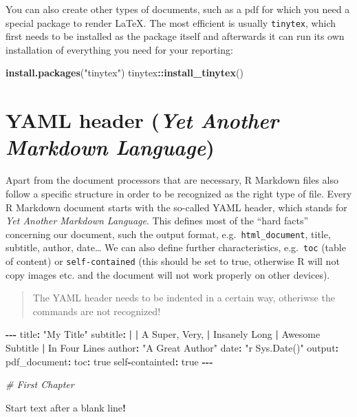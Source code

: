 \documentclass[
]{book}
\newenvironment{Shaded}{\begin{snugshade}}{\end{snugshade}}
\newcommand{\CommentTok}[1]{\textcolor[rgb]{0.56,0.35,0.01}{\textit{#1}}}
\newcommand{\ErrorTok}[1]{\textcolor[rgb]{0.64,0.00,0.00}{\textbf{#1}}}
\newcommand{\FunctionTok}[1]{\textcolor[rgb]{0.13,0.29,0.53}{\textbf{#1}}}
\newcommand{\NormalTok}[1]{#1}
\newcommand{\SpecialCharTok}[1]{\textcolor[rgb]{0.81,0.36,0.00}{\textbf{#1}}}
\newcommand{\StringTok}[1]{\textcolor[rgb]{0.31,0.60,0.02}{#1}}
\begin{document}
You can also create other types of documents, such as a pdf for which you need a special package to render \LaTeX.
The most efficient is usually \texttt{tinytex}, which first needs to be installed as the package itself and afterwards it can run its own installation of everything you need for your reporting:

\begin{Shaded}
\begin{Highlighting}[]
\FunctionTok{install.packages}\NormalTok{(}\StringTok{"tinytex"}\NormalTok{)}
\NormalTok{tinytex}\SpecialCharTok{::}\FunctionTok{install\_tinytex}\NormalTok{()}
\end{Highlighting}
\end{Shaded}

\section{\texorpdfstring{YAML header (\emph{Yet Another Markdown Language})}{YAML header (Yet Another Markdown Language)}}\label{yaml-header-yet-another-markdown-language}

Apart from the document processors that are necessary, R Markdown files also follow a specific structure in order to be recognized as the right type of file.
Every R Markdown document starts with the so-called YAML header, which stands for \emph{Yet Another Markdown Language}.
This defines most of the ``hard facts'' concerning our document, such the output format, e.g.~\texttt{html\_document}, title, subtitle, author, date\ldots{}
We can also define further characteristics, e.g.~\texttt{toc} (table of content) or \texttt{self-contained} (this should be set to true, otherwise R will not copy images etc. and the document will not work properly on other devices).

\begin{quote}
The YAML header needs to be indented in a certain way, otheriwse the commands are not recognized!
\end{quote}

\begin{Shaded}
\begin{Highlighting}[]
\SpecialCharTok{{-}{-}{-}}
\NormalTok{title}\SpecialCharTok{:} \StringTok{"My Title"}
\NormalTok{subtitle}\SpecialCharTok{:} \ErrorTok{|}
    \ErrorTok{|}\NormalTok{ A Super, Very,}
    \SpecialCharTok{|}\NormalTok{ Insanely Long}
    \SpecialCharTok{|}\NormalTok{ Awesome Subtitle}
    \SpecialCharTok{|}\NormalTok{ In Four Lines}
\NormalTok{author}\SpecialCharTok{:} \StringTok{"A Great Author"}
\NormalTok{date}\SpecialCharTok{:} \StringTok{"\textasciigrave{}r Sys.Date()\textasciigrave{}"}
\NormalTok{output}\SpecialCharTok{:} 
\NormalTok{  pdf\_document}\SpecialCharTok{:}
\NormalTok{    toc}\SpecialCharTok{:}\NormalTok{ true}
\NormalTok{    self}\SpecialCharTok{{-}}\NormalTok{containted}\SpecialCharTok{:}\NormalTok{ true}
\SpecialCharTok{{-}{-}{-}}

\CommentTok{\# First Chapter}

\NormalTok{Start text after a blank line}\SpecialCharTok{!} 
\end{Highlighting}
\end{Shaded}
\end{document}
